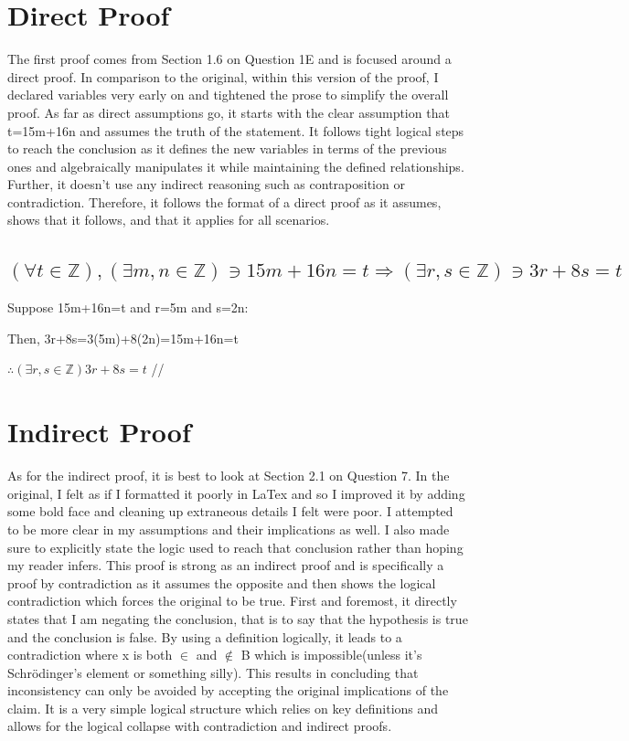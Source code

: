 \documentclass{article}
\begin{document}
\section{Direct Proof}
\justifying
The first proof comes from Section 1.6 on Question 1E and is focused around a direct proof. In comparison to the original, within this version of the proof, I declared variables very early on and tightened the prose to simplify the overall proof. As far as direct assumptions go, it starts with the clear assumption that t=15m+16n and assumes the truth of the statement. It follows tight logical steps to reach the conclusion as it defines the new variables in terms of the previous ones and algebraically manipulates it while maintaining the defined relationships. Further, it doesn't use any indirect reasoning such as contraposition or contradiction. Therefore, it follows the format of a direct proof as it assumes, shows that it follows, and that it applies for all scenarios.

\subsection{$(\forall t \in \mathbb{Z}), (\exists m,n \in \mathbb{Z}) \ni 15m+16n=t  \Rightarrow  (\exists r,s \in \mathbb{Z}) \ni 3r+8s=t$ }
\begin{center}
\raggedright
Suppose 15m+16n=t and r=5m and s=2n:

Then,  3r+8s=3(5m)+8(2n)=15m+16n=t

 $\therefore (\exists r,s \in \mathbb{Z}) 3r+8s=t $  //

\end{center}
\newpage
\section{Indirect Proof}
\justifying
As for the indirect proof, it is best to look at Section 2.1 on Question 7. In the original, I felt as if I formatted it poorly in LaTex and so I improved it by adding some bold face and cleaning up extraneous details I felt were poor. I attempted to be more clear in my assumptions and their implications as well. I also made sure to explicitly state the logic used to reach that conclusion rather than hoping my reader infers. This proof is strong as an indirect proof and is specifically a proof by contradiction as it assumes the opposite and then shows the logical contradiction which forces the original to be true. First and foremost, it directly states that I am negating the conclusion, that is to say that the hypothesis is true and the conclusion is false. By using a definition logically, it leads to a contradiction where x is both $\in$ and $\notin$ B which is impossible(unless it's Schrödinger's element or something silly). This results in concluding that inconsistency can only be avoided by accepting the original implications of the claim. It is a very simple logical structure which relies on key definitions and allows for the logical collapse with contradiction and indirect proofs.
\newpage
\end{document}
